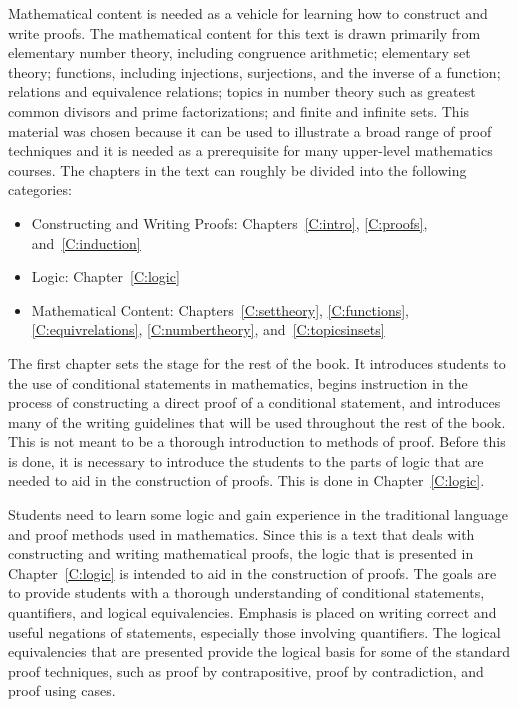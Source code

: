 Mathematical content is needed as a vehicle for learning how to construct and write proofs.  The mathematical content for this text is drawn primarily from elementary number theory, including congruence arithmetic; elementary set theory; functions, including injections, surjections, and the inverse of a function; relations and equivalence relations; topics in number theory such as greatest common divisors and prime factorizations; and finite and infinite sets.  This material was chosen because it can be used to illustrate a broad range of proof techniques and it is needed as a prerequisite for many upper-level mathematics courses.  The chapters in the text can roughly be divided into the following categories:

\begin{itemize}
\item Constructing and Writing Proofs:  Chapters~\ref{C:intro}, \ref{C:proofs}, and~\ref{C:induction}
\item Logic: Chapter~\ref{C:logic}
\item Mathematical Content: Chapters~\ref{C:settheory}, \ref{C:functions}, \ref{C:equivrelations}, \ref{C:numbertheory}, and~\ref{C:topicsinsets}
\end{itemize}

The first chapter sets the stage for the rest of the book.  It introduces students to the use of conditional statements in mathematics, begins instruction in the process of constructing a direct proof of a conditional statement, and introduces many of the writing guidelines that will be used throughout the rest of the book.  This is not meant to be a thorough introduction to methods of proof.  Before this is done, it is necessary to introduce the students to the parts of logic that are needed to aid in the construction of proofs.  This is done in 
Chapter~\ref{C:logic}.  

Students need to learn some logic and gain experience in the traditional language and proof methods used in mathematics. Since this is a text that deals with constructing and writing mathematical proofs, the logic that is presented in Chapter~\ref{C:logic} is intended to aid in the construction of proofs.  The goals are to provide students with a thorough understanding of conditional statements, quantifiers, and logical equivalencies.  Emphasis is placed on writing correct and useful negations of statements, especially those involving quantifiers.  The logical equivalencies that are presented provide the logical basis for some of the standard proof techniques, such as proof by contrapositive, proof by contradiction, and proof using cases.

